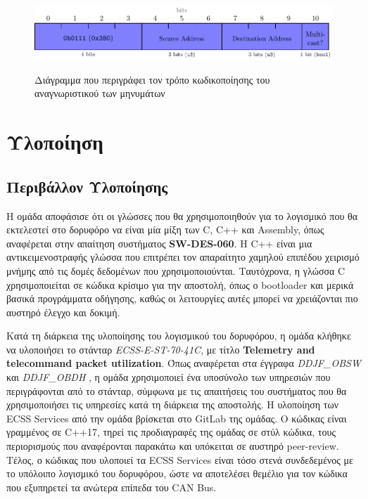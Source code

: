 \documentclass[a4paper,nobib,justified]{tufte-book}
\begin{document}
\begin{figure}[h]
	\includegraphics[width=0.8\linewidth]{media/diagrams/tp-message-id.pdf}
	\label{fig:tp-message-id}
	\cite{DDJF_OBDH}
	\caption{Διάγραμμα που περιγράφει τον τρόπο κωδικοποίησης του αναγνωριστικού των μηνυμάτων}
\end{figure}

\clearpage
\chapter{Υλοποίηση}
\label{implementation}
\section{Περιβάλλον Υλοποίησης}


Η ομάδα αποφάσισε ότι οι γλώσσες που θα χρησιμοποιηθούν για το λογισμικό που θα εκτελεστεί στο δορυφόρο να είναι μία μίξη των C, C++ και Assembly, όπως αναφέρεται στην απαίτηση συστήματος \textbf{SW-DES-060}. Η C++ είναι μια αντικειμενοστραφής γλώσσα που επιτρέπει τον απαραίτητο χαμηλού επιπέδου χειρισμό μνήμης από τις δομές δεδομένων που χρησιμοποιούνται. Ταυτόχρονα, η γλώσσα C χρησιμοποιείται σε κώδικα κρίσιμο για την αποστολή, όπως ο bootloader και μερικά βασικά προγράμματα οδήγησης, καθώς οι λειτουργίες αυτές μπορεί να χρειάζονται πιο αυστηρό έλεγχο και δοκιμή.


Κατά τη διάρκεια της υλοποίησης του λογισμικού του δορυφόρου, η ομάδα κλήθηκε να υλοποιήσει το στάνταρ \emph{ECSS-E-ST-70-41C}, με τίτλο \textbf{Telemetry and telecommand packet utilization}. Όπως αναφέρεται στα έγγραφα \emph{DDJF\_OBSW}  και \emph{DDJF\_OBDH} , η ομάδα χρησιμοποιεί ένα υποσύνολο των υπηρεσιών που περιγράφονται από το στάνταρ, σύμφωνα με τις απαιτήσεις του συστήματος που θα χρησιμοποιήσει τις υπηρεσίες κατά τη διάρκεια της αποστολής. Η υλοποίηση των ECSS Services από την ομάδα βρίσκεται στο GitLab της ομάδας. Ο κώδικας είναι γραμμένος σε C++17, τηρεί τις προδιαγραφές της ομάδας σε στύλ κώδικα, τους περιορισμούς που αναφέρονται παρακάτω και υπόκειται σε αυστηρό peer-review. Τέλος, ο κώδικας που υλοποιεί τα ECSS Services είναι τόσο στενά συνδεδεμένος με το υπόλοιπο λογισμικό του δορυφόρου, ώστε να αποτελέσει θεμέλιο για τον κώδικα που εξυπηρετεί τα ανώτερα επίπεδα του CAN Bus. 
\end{document}
